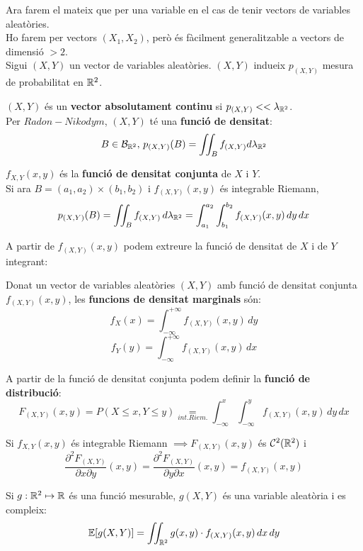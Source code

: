 Ara farem el mateix que per una variable en el cas de tenir vectors de variables aleatòries.\\
Ho farem per vectors $(X_{1},X_{2})$, però és fàcilment generalitzable a vectors de dimensió $> 2$. \\
Sigui $(X,Y)$ un vector de variables aleatòries. $(X,Y)$ indueix $p_{(X,Y)}$ mesura de probabilitat en $\mathbb{R}^{2}$.

\begin{defi}
  $(X,Y)$ és un \textbf{vector absolutament continu} si $p_{(X,Y)}<<\lambda_{\mathbb{R}^{2}}$. \\
  Per $Radon-Nikodym$, $(X,Y)$ té una \textbf{funció de densitat}:
  \[
    B\in\mathcal{B}_{\mathbb{R}^{2}}, \, p_{(X,Y)}(B)=\iint_{B}f_{(X,Y)}d\lambda_{\mathbb{R}^{2}}
  \]
\end{defi}

\begin{defi}
  $f_{X,Y}(x,y)$ és la \textbf{funció de densitat conjunta} de $X$ i $Y$.\\
  Si ara $B=(a_{1},a_{2})\times(b_{1},b_{2})$ i $f_{(X,Y)}(x,y)$ és integrable Riemann, 
  \[
    p_{(X,Y)}(B)=\iint_{B}f_{(X,Y)}\,d\lambda_{\mathbb{R}^{2}}=\int_{a_{1}}^{a_{2}}\int_{b_{1}}^{b_{2}}f_{(X,Y)}(x,y)\,dy\,dx
  \]
\end{defi}

A partir de $f_{(X,Y)}(x,y)$ podem extreure la funció de densitat de $X$ i de $Y$ integrant:

\begin{defi}
  Donat un vector de variables aleatòries $(X,Y)$ amb funció de densitat conjunta $f_{(X,Y)}(x,y)$, les \textbf{funcions de densitat marginals} són:
  \[
    f_{X}(x) = \int_{-\infty}^{+\infty}f_{(X,Y)}(x,y) \, dy
  \]
  \[
    f_{Y}(y) = \int_{-\infty}^{+\infty}f_{(X,Y)}(x,y) \, dx
  \]
\end{defi}

A partir de la funció de densitat conjunta podem definir la \textbf{funció de distribució}: 
\[
  F_{(X,Y)}(x,y) = P(X \leq x, Y \leq y) \underset{int. Riem.}{=} \int_{-\infty}^{x}\int_{-\infty}^{y} f_{(X,Y)}(x,y) \, dy \, dx
\]

\begin{obs}
  Si $f_{X,Y}(x,y)$ és integrable Riemann $\implies F_{(X,Y)}(x,y)$ és $\mathcal{C}^{2}(\mathbb{R}^{2})$ i
  \[
    \frac{\partial^{2}F_{(X,Y)}}{\partial x \partial y}(x,y) = \frac{\partial^{2}F_{(X,Y)}}{\partial y \partial x}(x,y) = f_{(X,Y)}(x,y)
  \]
\end{obs}

\begin{obs}
  Si $g:\mathbb{R}^{2} \mapsto \mathbb{R}$ és una funció mesurable, $g(X,Y)$ és una variable aleatòria i es compleix:
  \[
    \mathbb{E}[g(X,Y)] = \iint_{\mathbb{R}^{2}} g(x,y)\cdot f_{(X,Y)}(x,y) \, dx \, dy
  \]
\end{obs}


